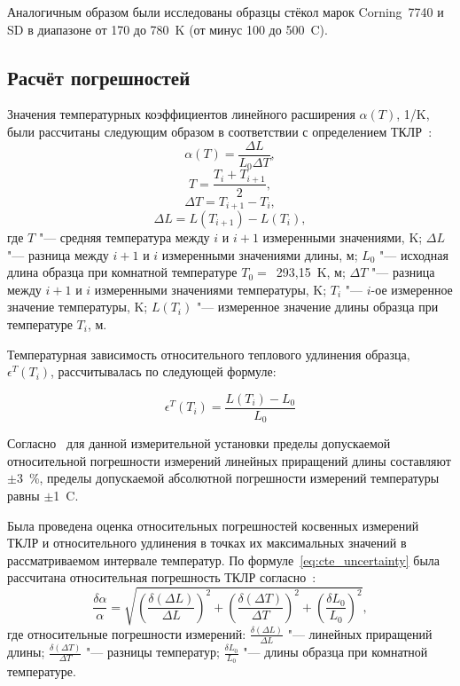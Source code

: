 Аналогичным образом были исследованы образцы стёкол марок Corning~7740 и SD  в диапазоне от 170 до 780~K (от минус 100 до 500~{\textdegree}C).

\subsection{Расчёт погрешностей}
Значения
температурных коэффициентов линейного расширения
$\alpha (T)$, 1/K, были рассчитаны следующим образом в соответствии с определением \mbox{ТКЛР}~\cites[150]{Mazurin1969_Tepl_rassh_stekla}[44]{novikova1974}:
\begin{equation}
  \alpha (T)=\frac{\Delta L}{L_0 \Delta T},
\end{equation}
\[
    T=\frac{T_i+T_{i+1}}{2},
\]
\[
    \Delta T=T_{i+1}-T_i,
\]
\[
    \Delta L=L(T_{i+1})-L(T_i),
\]
где $T$ "--- средняя температура между $i$ и $i+1$ измеренными значениями, K;  $\Delta L$ "--- разница между $i+1$ и $i$ измеренными значениями длины, м; $L_0$ "--- исходная длина образца при комнатной температуре $T_0 =$~293,15~K, м;  $\Delta T$ "--- разница между $i+1$ и $i$ измеренными значениями температуры, K; $T_i$ "--- $i$\nb-ое измеренное значение температуры, K; $L(T_i)$ "--- измеренное значение длины образца при температуре $T_i$, м.

Температурная зависимость относительного теплового удлинения образца,  $\epsilon^T(T_i)$, рассчитывалась по следующей формуле:

\begin{equation}
\epsilon^T(T_i)=\frac{L(T_i)-L_0}{L_0}
\end{equation}

Согласно~\cite{ref_gosreestr_tma_ss} для данной измерительной установки пределы допускаемой относительной погрешности измерений линейных приращений длины составляют ${\pm}$3~\%, пределы допускаемой абсолютной погрешности измерений температуры равны ${\pm}$1~{\textdegree}C.

Была проведена оценка относительных погрешностей косвенных измерений ТКЛР и относительного удлинения в точках их максимальных значений в рассматриваемом интервале температур.
По формуле~\eqref{eq:cte_uncertainty} была рассчитана относительная погрешность
ТКЛР согласно~\cites[58]{KassandrovaLebedev1970Obrabotka}:
\begin{equation}
    \label{eq:cte_uncertainty}
    \frac{\delta \alpha}{\alpha}=
    \sqrt{
        \left(
            \frac{\delta (\Delta L)}{\Delta L}
        \right)^{\!\!2} %
        +
        \left(
            \frac{\delta (\Delta T)}{\Delta T}
        \right)^{\!\!2} %
        +
        \left(
            \frac{\delta L_0}{L_0}
        \right)^{\!\!2} %
    },
\end{equation}
где относительные погрешности измерений:
$\frac{\delta (\Delta L)}{\Delta L}$ "--- линейных приращений длины;
$\frac{\delta (\Delta T)}{\Delta T}$ "--- разницы температур;
$\frac{\delta L_0}{L_0}$ "--- длины образца при комнатной температуре.

